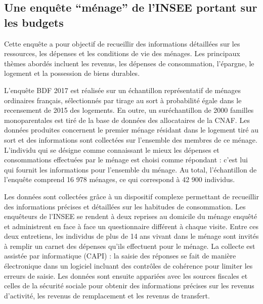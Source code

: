 \documentclass[
  12pt,
]{book}
\begin{document}
\subsection{Une enquête ``ménage'' de l'INSEE portant sur les
budgets}\label{une-enquuxeate-muxe9nage-de-linsee-portant-sur-les-budgets}

Cette enquête a pour objectif de recueillir des informations détaillées
sur les ressources, les dépenses et les conditions de vie des ménages.
Les principaux thèmes abordés incluent les revenus, les dépenses de
consommation, l'épargne, le logement et la possession de biens durables.

L'enquête BDF 2017 est réalisée sur un échantillon représentatif de
ménages ordinaires français, sélectionnés par tirage au sort à
probabilité égale dans le recensement de 2015 des logements. En outre,
un suréchantillon de 2000 familles monoparentales est tiré de la base de
données des allocataires de la CNAF. Les données produites concernent le
premier ménage résidant dans le logement tiré au sort et des
informations sont collectées sur l'ensemble des membres de ce ménage.
L'individu qui se désigne comme connaissant le mieux les dépenses et
consommations effectuées par le ménage est choisi comme répondant :
c'est lui qui fournit les informations pour l'ensemble du ménage. Au
total, l'échantillon de l'enquête comprend 16 978 ménages, ce qui
correspond à 42 900 individus.

Les données sont collectées grâce à un dispositif complexe permettant de
recueillir des informations précises et détaillées sur les habitudes de
consommation. Les enquêteurs de l'INSEE se rendent à deux reprises au
domicile du ménage enquêté et administrent en face à face un
questionnaire différent à chaque visite. Entre ces deux entretiens, les
individus de plus de 14 ans vivant dans le ménage sont invités à remplir
un carnet des dépenses qu'ils effectuent pour le ménage. La collecte est
assistée par informatique (CAPI) : la saisie des réponses se fait de
manière électronique dans un logiciel incluant des contrôles de
cohérence pour limiter les erreurs de saisie. Les données sont ensuite
appariées avec les sources fiscales et celles de la sécurité sociale
pour obtenir des informations précises sur les revenus d'activité, les
revenus de remplacement et les revenus de transfert.
\end{document}
